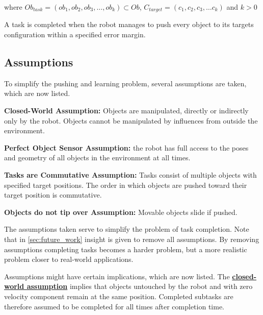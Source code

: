 where $Ob_{task} = (ob_1, ob_2, ob_3, \dots, ob_k) \subset Ob$, $C_{target} = (c_1, c_2, c_3, \dots c_k)$ and $k>0$\bs

A task is completed when the robot manages to push every object to its targets configuration within a specified error margin.

\subsection{Assumptions}%
\label{subsec:assumptions}
To simplify the pushing and learning problem, several assumptions are taken, which are now listed.\bs

\begin{assumption*}%
\label{assumption:closed_world}
\textbf{Closed-World Assumption:} Objects are manipulated, directly or indirectly only by the robot. Objects cannot be manipulated by influences from outside the environment.
\end{assumption*}\bs

\begin{assumption*}%
\label{assumption:perfect_object_sensor}
\textbf{Perfect Object Sensor Assumption:} the robot has full access to the poses and geometry of all objects in the environment at all times.
\end{assumption*}\bs

\begin{assumption*}%
\label{assumption:order_does_not_matter}
\textbf{Tasks are Commutative Assumption:} Tasks consist of multiple objects with specified target positions. The order in which objects are pushed toward their target position is commutative.
\end{assumption*}\bs

\begin{assumption*}%
\label{assumption:no_tipping}
\textbf{Objects do not tip over Assumption:} Movable objects slide if pushed.
\end{assumption*}\bs

The assumptions taken serve to simplify the problem of task completion. Note that in \cref{sec:future_work} insight is given to remove all assumptions. By removing assumptions completing tasks becomes a harder problem, but a more realistic problem closer to real-world applications.\bs

Assumptions might have certain implications, which are now listed. The \hyperref[assumption:closed_world]{\textbf{closed-world assumption}} implies that objects untouched by the robot and with zero velocity component remain at the same position. Completed subtasks are therefore assumed to be completed for all times after completion time.\bs

